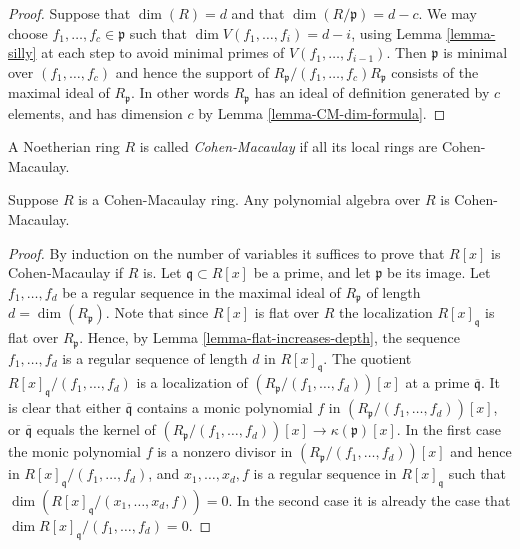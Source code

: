 \begin{proof}
Suppose that $\dim(R) = d$ and that $\dim(R/\mathfrak p) = d - c$.
We may choose $f_1,\ldots,f_c \in \mathfrak p$ such that
$\dim V(f_1,\ldots,f_i) = d - i$, using Lemma \ref{lemma-silly}
at each step to avoid minimal primes of $V(f_1,\ldots,f_{i-1})$.
Then $\mathfrak p$ is minimal over $(f_1,\ldots,f_c)$ and hence
the support of $R_{\mathfrak p}/(f_1,\ldots,f_c)R_{\mathfrak p}$ consists
of the maximal ideal of $R_{\mathfrak p}$. In other words
$R_{\mathfrak p}$ has an ideal of definition generated by
$c$ elements, and has dimension $c$ by Lemma \ref{lemma-CM-dim-formula}.
\end{proof}

\begin{definition}
\label{definition-ring-CM}
A Noetherian ring $R$ is called {\it Cohen-Macaulay} if all
its local rings are Cohen-Macaulay.
\end{definition}

\begin{lemma}
\label{lemma-CM-polynomial-algebra}
Suppose $R$ is a Cohen-Macaulay ring.
Any polynomial algebra over $R$ is Cohen-Macaulay.
\end{lemma}

\begin{proof}
By induction on the number of variables it suffices
to prove that $R[x]$ is Cohen-Macaulay if $R$ is.
Let $\mathfrak q \subset R[x]$ be a prime, and
let $\mathfrak p$ be its image.
Let $f_1,\ldots,f_d$ be a regular sequence
in the maximal ideal of $R_{\mathfrak p}$ of length
$d = \dim(R_{\mathfrak p})$. Note that since
$R[x]$ is flat over $R$ the localization
$R[x]_{\mathfrak q}$ is flat over $R_{\mathfrak p}$.
Hence, by Lemma \ref{lemma-flat-increases-depth}, the sequence $f_1,\ldots,f_d$
is a regular sequence of length $d$ in $R[x]_{\mathfrak q}$.
The quotient $R[x]_{\mathfrak q}/(f_1,\ldots,f_d)$
is a localization of $(R_{\mathfrak p}/(f_1,\ldots,f_d))[x]$
at a prime $\overline{\mathfrak q}$. It is clear that
either $\overline{\mathfrak q}$ contains a monic
polynomial $f$ in $(R_{\mathfrak p}/(f_1,\ldots,f_d))[x]$,
or $\overline{\mathfrak q}$ equals the kernel of
$(R_{\mathfrak p}/(f_1,\ldots,f_d))[x] \to \kappa(\mathfrak p)[x]$.
In the first case the monic polynomial $f$ is a nonzero
divisor in $(R_{\mathfrak p}/(f_1,\ldots,f_d))[x]$ and hence
in $R[x]_{\mathfrak q}/(f_1,\ldots,f_d)$, and $x_1,\ldots,x_d, f$
is a regular sequence in $R[x]_{\mathfrak q}$
such that $\dim(R[x]_{\mathfrak q}/(x_1,\ldots,x_d,f)) = 0$.
In the second case it is already the case that
$\dim R[x]_{\mathfrak q}/(f_1,\ldots,f_d) = 0$.
\end{proof}


